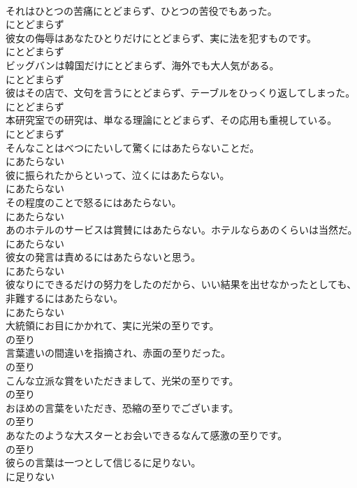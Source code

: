 \documentclass[8pt]{extreport}
\begin{document}
\begin{CJK}{UTF8}{min}
\\	それはひとつの苦痛にとどまらず、ひとつの苦役でもあった。	
\\	にとどまらず
\\	彼女の侮辱はあなたひとりだけにとどまらず、実に法を犯すものです。	
\\	にとどまらず
\\	ビッグバンは韓国だけにとどまらず、海外でも大人気がある。	
\\	にとどまらず
\\	彼はその店で、文句を言うにとどまらず、テーブルをひっくり返してしまった。	
\\	にとどまらず
\\	本研究室での研究は、単なる理論にとどまらず、その応用も重視している。	
\\	にとどまらず
\\	そんなことはべつにたいして驚くにはあたらないことだ。	
\\	にあたらない
\\	彼に振られたからといって、泣くにはあたらない。	
\\	にあたらない
\\	その程度のことで怒るにはあたらない。	
\\	にあたらない
\\	あのホテルのサービスは賞賛にはあたらない。ホテルならあのくらいは当然だ。	
\\	にあたらない
\\	彼女の発言は責めるにはあたらないと思う。	
\\	にあたらない
\\	彼なりにできるだけの努力をしたのだから、いい結果を出せなかったとしても、非難するにはあたらない。	
\\	にあたらない
\\	大統領にお目にかかれて、実に光栄の至りです。	
\\	の至り
\\	言葉遣いの間違いを指摘され、赤面の至りだった。	
\\	の至り
\\	こんな立派な賞をいただきまして、光栄の至りです。	
\\	の至り
\\	おほめの言葉をいただき、恐縮の至りでございます。	
\\	の至り
\\	あなたのような大スターとお会いできるなんて感激の至りです。	
\\	の至り
\\	彼らの言葉は一つとして信じるに足りない。	
\\	に足りない

\end{CJK}
\end{document}
